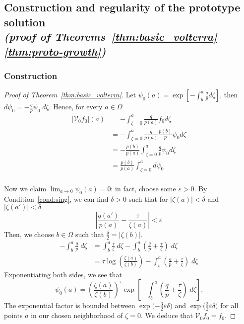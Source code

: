 \documentclass{article}
\theoremstyle{plain}
\newcommand{\hardpart}{\mathcal{V}_0}
\begin{document}
\subsection{Construction and regularity of the prototype solution \\ \textit{(proof of Theorems~\ref{thm:basic_volterra}--\ref{thm:proto-growth})}}\label{sec:proto-construction-regularity}

\subsubsection{Construction}\label{sec:construction}
\begin{proof}[Proof of Theorem~\ref{thm:basic_volterra}]
    Let $\psi_0(a)= \exp\left[-\int_{b}^{a}\frac{q}{p} d\zeta\right]$, then $ d \psi_0 = -\frac{q}{p} \psi_0\;d\zeta $. Hence, for every $a\in\Omega$ 
    \begin{align*}
        \big[\hardpart f_0\big](a) &= - \int_{\zeta=0}^{a} \frac{q}{p(a)} f_0 d\zeta \\
        &= - \int_{\zeta=0}^{a} \frac{q}{p(a)} \frac{p(b)}{p}\psi_0 d\zeta \\
        &= - \frac{p(b)}{p(a)}  \int_{\zeta=0}^{a} \frac{q}{p} \psi_0 d\zeta\\
        &= \frac{p(b)}{p(a)}  \int_{\zeta=0}^{a} d\psi_0  \\
    \end{align*}

    Now we claim $\lim_{a\to 0}\psi_0(a)=0$: in fact, choose some $\varepsilon>0$. By Condition~\eqref{cond:sing}, we can find $\delta>0$ such that for $|\zeta(a)|<\delta$ and $|\zeta(a')|<\delta$
\begin{equation}\label{eqn:limit_h1}
\left|\frac{q(a')}{p(a)} - \frac{\tau}{\zeta(a)}\right|<\varepsilon
\end{equation}
 Then, we choose $b\in\Omega$ such that $\tfrac{\delta}{2}=|\zeta(b)|$.
\begin{align*}
-\int_b^a \frac{q}{p}\;d\zeta & = \int_b^a \frac{\tau}{\zeta}\;d\zeta - \int_b^a \left( \frac{q}{p} + \frac{\tau}{\zeta} \right)\;d\zeta \\
& = \tau \log\left(\frac{\zeta(a)}{\zeta(b)}\right) - \int_b^a \left( \frac{q}{p} + \frac{\tau}{\zeta} \right)\;d\zeta
\end{align*}
Exponentiating both sides, we see that
\[ \psi_0(a) = \left(\frac{\zeta(a)}{\zeta(b)}\right)^\tau \exp\left[-\int_b^a \left( \frac{q}{p} + \frac{\tau}{\zeta} \right)\;d\zeta\right]. \]
The exponential factor is bounded between $\exp\big({-\tfrac{3}{2}\varepsilon\delta}\big)$ and $\exp\big(\tfrac{3}{2}\varepsilon\delta\big)$ for all points $a$ in our chosen neighborhood of $\zeta = 0$. We deduce that $\hardpart  f_0=f_0$. 
\end{proof}
\end{document}
